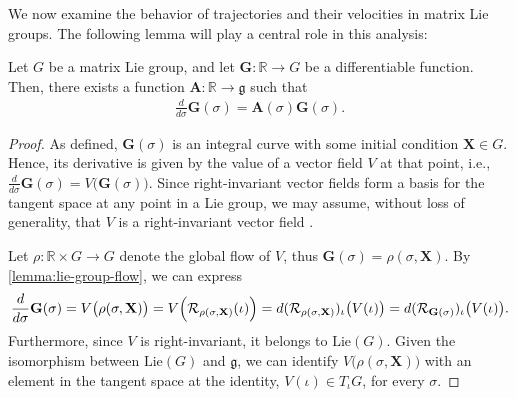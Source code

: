 We now examine the behavior of trajectories and their velocities in matrix Lie groups. The following lemma will play a central role in this analysis:
\begin{lemma} \label{lemma:derivative-lie-element-H-parallelizable} Let $G$ be a matrix Lie group, and let $\mathbf{G}:\mathbb{R}\to G$ be a differentiable function. Then, there exists a function $\mathbf{A}:\mathbb{R} \to \mathfrak{g}$ such that 
\begin{align}
    \frac{d}{d\sigma} \mathbf{G}(\sigma) = \mathbf{A}(\sigma) \mathbf{G}(\sigma). \label{eq:derivative-lie-element-H-parallelizable}
\end{align}
\end{lemma}
\begin{proof}
    As defined, $\mathbf{G}(\sigma)$ is an integral curve with some initial condition $\mathbf{X}\in G$. Hence, its derivative is given by the value of a vector field $V$ at that point, i.e., $\frac{d}{d\sigma}\mathbf{G}(\sigma) = V\bigl(\mathbf{G}(\sigma)\bigr)$. Since right-invariant vector fields form a basis for the tangent space at any point in a Lie group, we may assume, without loss of generality, that $V$ is a right-invariant vector field \citep[p. 192]{Lee2012}.

    Let $\rho: \mathbb{R} \times G \to G$ denote the global flow of $V$, thus $\mathbf{G}(\sigma) = \rho(\sigma, \mathbf{X})$. By \cref{lemma:lie-group-flow}, we can express
    \begin{align}
        \frac{d}{d\sigma} \mathbf{G}(\sigma) = V\bigl(\rho(\sigma, \mathbf{X})\bigr) = V\Bigl(\mathcal{R}_{\rho(\sigma, \mathbf{X})}(\iota)\Bigr) = d(\mathcal{R}_{\rho(\sigma, \mathbf{X})})_{\iota}\bigl(V(\iota)\bigr) = d(\mathcal{R}_{\mathbf{G}(\sigma)})_{\iota}\bigl(V(\iota)\bigr).
    \end{align}
    Furthermore, since $V$ is right-invariant, it belongs to $\text{Lie}(G)$. Given the isomorphism between $\text{Lie}(G)$ and $\mathfrak{g}$, we can identify $V\bigl(\rho(\sigma, \mathbf{X})\bigr)$ with an element in the tangent space at the identity, $V(\iota)\in T_\iota G$, for every $\sigma$. 
    

\end{proof}
